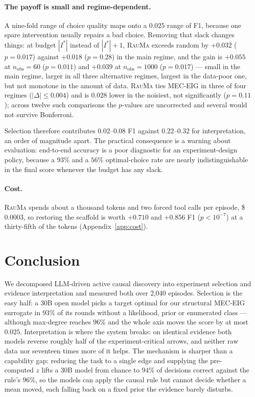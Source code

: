 \documentclass{article}
\newcommand{\rauma}{\textsc{RauMa}}
\begin{document}
\paragraph{The payoff is small and regime-dependent.} A nine-fold range of choice quality maps
onto a $0.025$ range of F1, because one spare intervention usually repairs a bad choice. Removing
that slack changes things: at budget $|I^*|$ instead of $|I^*|+1$, \rauma{} exceeds random by
$+0.032$ ($p=0.017$) against $+0.018$ ($p=0.28$) in the main regime, and the gain is $+0.055$ at
$n_{\mathrm{obs}}=60$ ($p=0.011$) and $+0.039$ at $n_{\mathrm{obs}}=1000$ ($p=0.017$) --- small
in the main regime, larger in all three alternative regimes, largest in the data-poor one, but
not monotone in the amount of data. \rauma{} ties MEC-EIG in three of four regimes ($|\Delta|
\leq 0.004$) and is $0.028$ lower in the noisiest, not significantly ($p=0.11$); across twelve
such comparisons the $p$-values are uncorrected and several would not survive Bonferroni.

Selection therefore contributes $0.02$--$0.08$ F1 against $0.22$--$0.32$ for interpretation, an
order of magnitude apart. The practical consequence is a warning about evaluation: end-to-end
accuracy is a poor diagnostic for an experiment-design policy, because a $93\%$ and a $56\%$
optimal-choice rate are nearly indistinguishable in the final score whenever the budget has any
slack.

\paragraph{Cost.} \rauma{} spends about a thousand tokens and two forced tool calls per episode,
\$$0.0003$, so restoring the scaffold is worth $+0.710$ and $+0.856$ F1 ($p<10^{-7}$) at a
thirty-fifth of the tokens (Appendix~\ref{app:cost}).


\section{Conclusion}
\label{sec:conclusion}

We decomposed LLM-driven active causal discovery into experiment selection and evidence
interpretation and measured both over 2{,}040 episodes. Selection is the easy half: a 30B open
model picks a target optimal for our structural MEC-EIG surrogate in $93\%$ of its rounds
without a likelihood, prior or enumerated class --- although max-degree reaches $96\%$ and the
whole axis moves the score by at most $0.025$. Interpretation is where the system breaks: on
identical evidence both models reverse roughly half of the experiment-critical arrows, and
neither raw data nor seventeen times more of it helps. The mechanism is sharper than a
capability gap: reducing the task to a single edge and supplying the pre-computed $z$ lifts a
30B model from chance to $94\%$ of decisions correct against the rule's $96\%$, so the models
can apply the causal rule but cannot decide whether a mean moved, each falling back on a fixed
prior the evidence barely disturbs.
\end{document}
